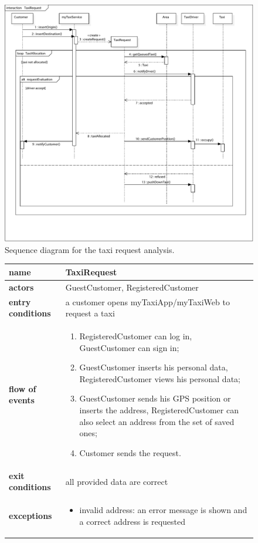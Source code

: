 \begin{figure}%
	\includegraphics[width=\textwidth]{img/S_TaxiRequest}%
	\caption{Sequence diagram for the taxi request analysis.}%
\end{figure}

\begin{figure}\begin{tabularx}{\textwidth}{ >{\bfseries}l X }\toprule%
	name				&	TaxiRequest%
	\\ \midrule%
	actors				&	GuestCustomer, RegisteredCustomer%
	\\ \midrule%
	entry conditions	&	a customer opens myTaxiApp/myTaxiWeb to request a taxi%
	\\ \midrule%
	flow of events		&	\begin{enumerate}%
		\item RegisteredCustomer can log in, GuestCustomer can sign in;%
		\item GuestCustomer inserts his personal data, RegisteredCustomer views his personal data;%
		\item GuestCustomer sends his GPS position or inserts the address, RegisteredCustomer can also select an address from the set of saved ones;%
		\item Customer sends the request.%
	\end{enumerate} \\ \midrule%
	exit conditions		&	 all provided data are correct%
	\\ \midrule%
	exceptions			&	\begin{itemize}%
		\item invalid address: an error message is shown and a correct address is requested%
	\end{itemize} \\ \bottomrule%
\end{tabularx}\end{figure}



